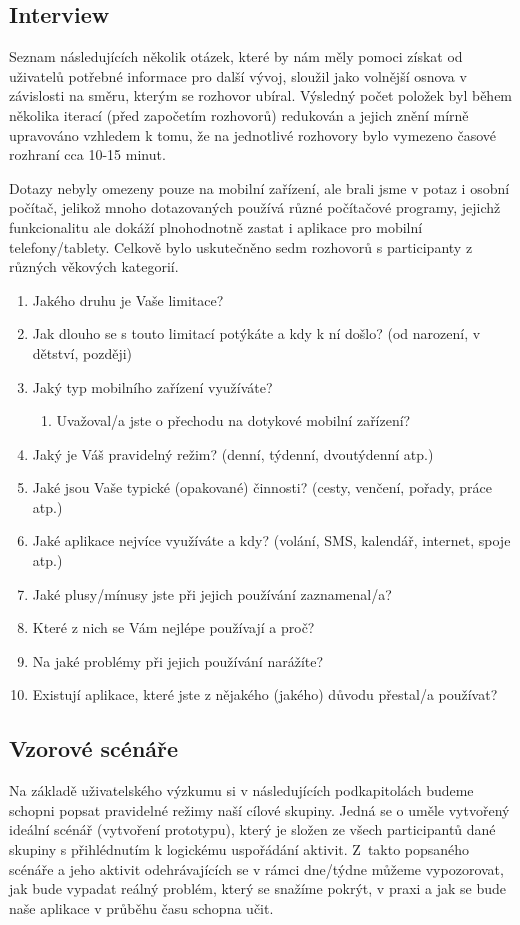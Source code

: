 \documentclass[thesis=M,czech]{FITthesis}[2012/06/26]
\begin{document}
\subsection{Interview}
Seznam následujících několik otázek, které by nám měly pomoci získat od uživatelů potřebné informace pro další vývoj, sloužil jako volnější osnova v závislosti na směru, kterým se rozhovor ubíral. Výsledný počet položek byl během několika iterací (před započetím rozhovorů) redukován a jejich znění mírně upravováno vzhledem k tomu, že na jednotlivé rozhovory bylo vymezeno časové rozhraní cca 10-15 minut.

Dotazy nebyly omezeny pouze na mobilní zařízení, ale brali jsme v potaz i osobní počítač, jelikož mnoho dotazovaných používá různé počítačové programy, jejichž funkcionalitu ale dokáží plnohodnotně zastat i aplikace pro mobilní telefony/tablety. Celkově bylo uskutečněno sedm rozhovorů s participanty z různých věkových kategorií.

\begin{enumerate}
\item Jakého druhu je Vaše limitace?
\item Jak dlouho se s touto limitací potýkáte a kdy k ní došlo? (od narození, v dětství, později)
\item Jaký typ mobilního zařízení využíváte?
\begin{enumerate}
\item Uvažoval/a jste o přechodu na dotykové mobilní zařízení?
\end{enumerate}
\item Jaký je Váš pravidelný režim? (denní, týdenní, dvoutýdenní atp.)
\item Jaké jsou Vaše typické (opakované) činnosti? (cesty, venčení, pořady, práce atp.)
\item Jaké aplikace nejvíce využíváte a kdy? (volání, SMS, kalendář, internet, spoje atp.)
\item Jaké plusy/mínusy jste při jejich používání zaznamenal/a?
\item Které z nich se Vám nejlépe používají a proč?
\item Na jaké problémy při jejich používání narážíte?
\item Existují aplikace, které jste z nějakého (jakého) důvodu přestal/a používat?
\end{enumerate}

\subsection{Vzorové scénáře}\label{scenario}
Na základě uživatelského výzkumu si v následujících podkapitolách budeme schopni popsat pravidelné režimy naší cílové skupiny. Jedná se o uměle vytvořený ideální scénář (vytvoření prototypu), který je složen ze všech participantů dané skupiny s přihlédnutím k logickému uspořádání aktivit. Z~takto popsaného scénáře a jeho aktivit odehrávajících se v rámci dne/týdne můžeme vypozorovat, jak bude vypadat reálný problém, který se snažíme pokrýt, v praxi a jak se bude naše aplikace v průběhu času schopna učit.
\end{document}
